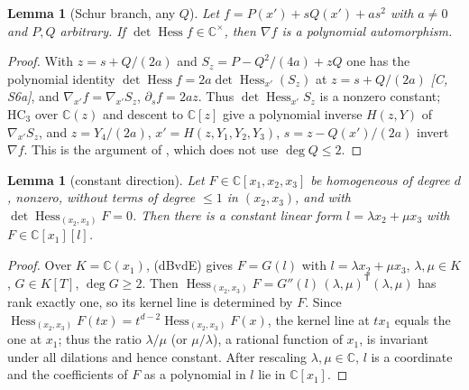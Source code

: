 \documentclass[11pt]{article}
\newtheorem{lemma}[theorem]{Lemma}
\theoremstyle{remark}
\newcommand{\C}{\mathbb{C}}
\newcommand{\Hess}{\operatorname{Hess}}
\begin{document}
\begin{lemma}[Schur branch, any $Q$]\label{lem:A}
Let $f=P(x')+sQ(x')+as^2$ with $a\ne0$ and $P,Q$ arbitrary. If $\det\Hess f\in\C^\times$, then $\nabla f$ is a polynomial automorphism.
\end{lemma}
\begin{proof}
With $z=s+Q/(2a)$ and $S_z=P-Q^2/(4a)+zQ$ one has the polynomial identity $\det\Hess f=2a\det\Hess_{x'}(S_z)$ at $z=s+Q/(2a)$ \emph{[C, S6a]}, and $\nabla_{x'}f=\nabla_{x'}S_z$, $\partial_sf=2az$. Thus $\det\Hess_{x'}S_z$ is a nonzero constant; $\mathrm{HC}_3$ over $\C(z)$ and descent to $\C[z]$ give a polynomial inverse $H(z,Y)$ of $\nabla_{x'}S_z$, and $z=Y_4/(2a)$, $x'=H(z,Y_1,Y_2,Y_3)$, $s=z-Q(x')/(2a)$ invert $\nabla f$. This is the argument of \cite[Prop.~6.1, branch $a\ne0$]{Ni}, which does not use $\deg Q\le2$.
\end{proof}

\begin{lemma}[constant direction]\label{lem:H}
Let $F\in\C[x_1,x_2,x_3]$ be homogeneous of degree $d$, nonzero, without terms of degree $\le1$ in $(x_2,x_3)$, and with $\det\Hess_{(x_2,x_3)}F=0$. Then there is a constant linear form $l=\lambda x_2+\mu x_3$ with $F\in\C[x_1][l]$.
\end{lemma}
\begin{proof}
Over $K=\C(x_1)$, (dBvdE) gives $F=G(l)$ with $l=\lambda x_2+\mu x_3$, $\lambda,\mu\in K$, $G\in K[T]$, $\deg G\ge2$. Then $\Hess_{(x_2,x_3)}F=G''(l)\,(\lambda,\mu)^{\mathsf T}(\lambda,\mu)$ has rank exactly one, so its kernel line is determined by $F$. Since $\Hess_{(x_2,x_3)}F(tx)=t^{d-2}\Hess_{(x_2,x_3)}F(x)$, the kernel line at $tx_1$ equals the one at $x_1$; thus the ratio $\lambda/\mu$ (or $\mu/\lambda$), a rational function of $x_1$, is invariant under all dilations and hence constant. After rescaling $\lambda,\mu\in\C$, $l$ is a coordinate and the coefficients of $F$ as a polynomial in $l$ lie in $\C[x_1]$.
\end{proof}
\end{document}
